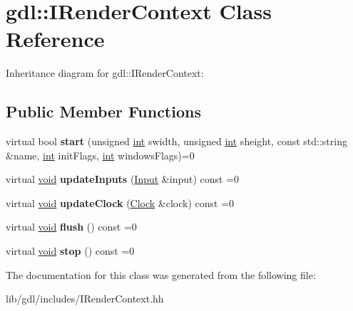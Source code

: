 \hypertarget{classgdl_1_1_i_render_context}{}\section{gdl\+:\+:I\+Render\+Context Class Reference}
\label{classgdl_1_1_i_render_context}


Inheritance diagram for gdl\+:\+:I\+Render\+Context\+:
\subsection*{Public Member Functions}
\begin{DoxyCompactItemize}
\item 
\hypertarget{classgdl_1_1_i_render_context_a962fd24dc84758aaa7c7d28330c3e37e}{}virtual bool {\bfseries start} (unsigned \hyperlink{_s_d_l__thread_8h_a6a64f9be4433e4de6e2f2f548cf3c08e}{int} swidth, unsigned \hyperlink{_s_d_l__thread_8h_a6a64f9be4433e4de6e2f2f548cf3c08e}{int} sheight, const std\+::string \&name, \hyperlink{_s_d_l__thread_8h_a6a64f9be4433e4de6e2f2f548cf3c08e}{int} init\+Flags, \hyperlink{_s_d_l__thread_8h_a6a64f9be4433e4de6e2f2f548cf3c08e}{int} windows\+Flags)=0\label{classgdl_1_1_i_render_context_a962fd24dc84758aaa7c7d28330c3e37e}

\item 
\hypertarget{classgdl_1_1_i_render_context_a19ffcdcc82d88098693a08f66beab770}{}virtual \hyperlink{_s_d_l__audio_8h_a52835ae37c4bb905b903cbaf5d04b05f}{void} {\bfseries update\+Inputs} (\hyperlink{classgdl_1_1_input}{Input} \&input) const =0\label{classgdl_1_1_i_render_context_a19ffcdcc82d88098693a08f66beab770}

\item 
\hypertarget{classgdl_1_1_i_render_context_af2134a929634632ccf13e779f489cdc2}{}virtual \hyperlink{_s_d_l__audio_8h_a52835ae37c4bb905b903cbaf5d04b05f}{void} {\bfseries update\+Clock} (\hyperlink{classgdl_1_1_clock}{Clock} \&clock) const =0\label{classgdl_1_1_i_render_context_af2134a929634632ccf13e779f489cdc2}

\item 
\hypertarget{classgdl_1_1_i_render_context_aa7ad85ff39d1e82f25162b71284b3659}{}virtual \hyperlink{_s_d_l__audio_8h_a52835ae37c4bb905b903cbaf5d04b05f}{void} {\bfseries flush} () const =0\label{classgdl_1_1_i_render_context_aa7ad85ff39d1e82f25162b71284b3659}

\item 
\hypertarget{classgdl_1_1_i_render_context_af1f487e928504f86f878f904fb4075cf}{}virtual \hyperlink{_s_d_l__audio_8h_a52835ae37c4bb905b903cbaf5d04b05f}{void} {\bfseries stop} () const =0\label{classgdl_1_1_i_render_context_af1f487e928504f86f878f904fb4075cf}

\end{DoxyCompactItemize}


The documentation for this class was generated from the following file\+:\begin{DoxyCompactItemize}
\item 
lib/gdl/includes/I\+Render\+Context.\+hh\end{DoxyCompactItemize}
